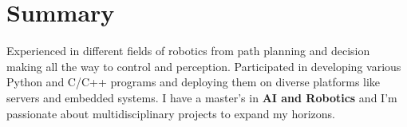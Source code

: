 
\section{Summary}
  \vspace{2pt}
  \resumeSubHeadingListStart
  \item{Experienced in different fields of robotics from path planning and decision making all the way to control and perception. Participated in developing various Python and C/C++ programs and deploying them on diverse platforms like servers and embedded systems. I have a master's in \textbf{AI and Robotics} and I'm passionate about multidisciplinary projects to expand my horizons.}
  \resumeSubHeadingListEnd
